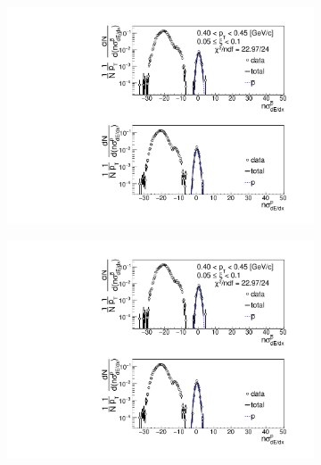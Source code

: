 \begin{figure}[h!]
\begin{subfigure}{.32\textwidth}
	\end{subfigure}
	\begin{subfigure}{.32\textwidth}
		\includegraphics[width=\linewidth, page=9]{chapters/chrgSTAR/img/dEdx/fit2019_thirdStep_2_1.pdf}
	\end{subfigure}
	\begin{subfigure}{.32\textwidth}
		\includegraphics[width=\linewidth, page=10]{chapters/chrgSTAR/img/dEdx/fit2019_thirdStep_2_1.pdf}
	\end{subfigure}
	\begin{subfigure}{.32\textwidth}

\end{subfigure}
\end{figure}
